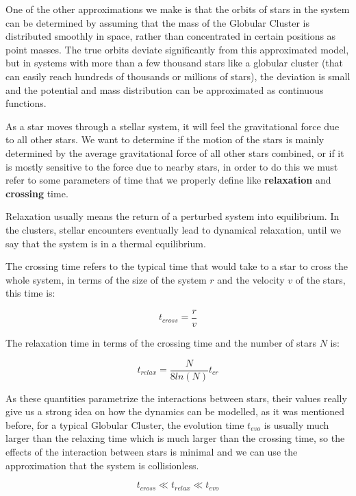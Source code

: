 One of the other approximations we make is that the orbits of stars in the system can be determined by assuming that the mass of the Globular Cluster is distributed smoothly in space, rather than concentrated in certain positions as point masses. The true orbits deviate significantly from this approximated model, but in systems with more than a few thousand stars like a globular cluster (that can easily reach hundreds of thousands or millions of stars), the deviation is small and the potential and mass distribution can be approximated as continuous functions. 

As a star moves through a stellar system, it will feel the gravitational force due to all other stars. We want to determine if the motion of the stars is mainly determined by the average gravitational force of all other stars combined, or if it is mostly sensitive to the force due to nearby stars, in order to do this we must refer to some parameters of time that we properly define like \textbf{relaxation} and \textbf{crossing} time. 

Relaxation usually means the return of a perturbed system into equilibrium. In the clusters, stellar encounters eventually lead to dynamical relaxation, until we say that the system is in a thermal equilibrium. 

The crossing time refers to the typical time that would take to a star to cross the whole system, in terms of the size of the system $r$ and the velocity $v$ of the stars, this time is:

\begin{equation}
t_{cross}=\frac{r}{v}
\end{equation}

The relaxation time in terms of the crossing time and the number of stars $N$ is:

\begin{equation}
t_{relax}=\frac{N}{8ln(N)}t_{cr}
\end{equation}

As these quantities parametrize the interactions between stars, their values really give us a strong idea on how the dynamics can be modelled, as it was mentioned before, for a typical Globular Cluster, the evolution time $t_{evo}$ is usually much larger than the relaxing time which is much larger than the crossing time, so the effects of the interaction between stars is minimal and we can use the approximation that the system is collisionless.

\begin{equation}
t_{cross}\ll t_{relax}\ll t_{evo}
\end{equation}

